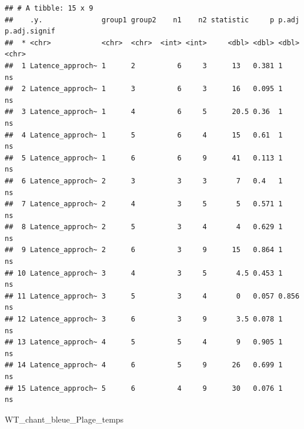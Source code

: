 \documentclass[
  french,
]{article}
\newenvironment{Shaded}{\begin{snugshade}}{\end{snugshade}}
\newcommand{\NormalTok}[1]{#1}
\begin{document}
\begin{verbatim}
## # A tibble: 15 x 9
##    .y.              group1 group2    n1    n2 statistic     p p.adj p.adj.signif
##  * <chr>            <chr>  <chr>  <int> <int>     <dbl> <dbl> <dbl> <chr>       
##  1 Latence_approch~ 1      2          6     3      13   0.381 1     ns          
##  2 Latence_approch~ 1      3          6     3      16   0.095 1     ns          
##  3 Latence_approch~ 1      4          6     5      20.5 0.36  1     ns          
##  4 Latence_approch~ 1      5          6     4      15   0.61  1     ns          
##  5 Latence_approch~ 1      6          6     9      41   0.113 1     ns          
##  6 Latence_approch~ 2      3          3     3       7   0.4   1     ns          
##  7 Latence_approch~ 2      4          3     5       5   0.571 1     ns          
##  8 Latence_approch~ 2      5          3     4       4   0.629 1     ns          
##  9 Latence_approch~ 2      6          3     9      15   0.864 1     ns          
## 10 Latence_approch~ 3      4          3     5       4.5 0.453 1     ns          
## 11 Latence_approch~ 3      5          3     4       0   0.057 0.856 ns          
## 12 Latence_approch~ 3      6          3     9       3.5 0.078 1     ns          
## 13 Latence_approch~ 4      5          5     4       9   0.905 1     ns          
## 14 Latence_approch~ 4      6          5     9      26   0.699 1     ns          
## 15 Latence_approch~ 5      6          4     9      30   0.076 1     ns
\end{verbatim}

\begin{Shaded}
\begin{Highlighting}[]
\NormalTok{WT\_chant\_bleue\_Plage\_temps}
\end{Highlighting}
\end{Shaded}
\end{document}
